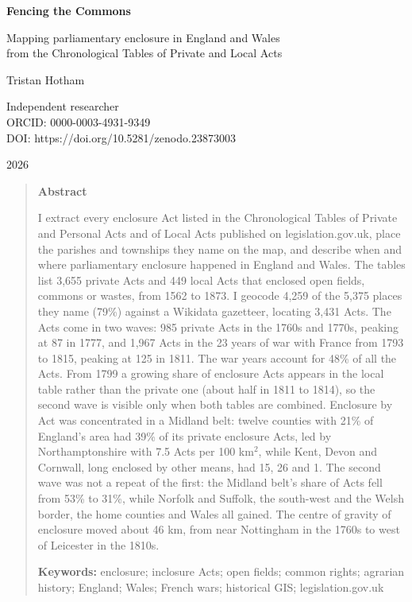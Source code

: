 \documentclass[11pt,a4paper]{article}
\begin{document}
\begin{center}
{\Large\bfseries Fencing the Commons\par}
\vspace{0.4em}
{\large Mapping parliamentary enclosure in England and Wales\\from the Chronological Tables of Private and Local Acts\par}
\vspace{1.2em}
{\large Tristan Hotham\par}
\vspace{0.3em}
{\small Independent researcher\\
ORCID: 0000-0003-4931-9349\\
DOI: https://doi.org/10.5281/zenodo.23873003\par}
\vspace{0.8em}
2026
\end{center}

\begin{quote}
\small
\begin{center}\textbf{Abstract}\end{center}
I extract every enclosure Act listed in the Chronological Tables of Private and Personal Acts and of Local Acts published on legislation.gov.uk, place the parishes and townships they name on the map, and describe when and where parliamentary enclosure happened in England and Wales. The tables list 3,655 private Acts and 449 local Acts that enclosed open fields, commons or wastes, from 1562 to 1873. I geocode 4,259 of the 5,375 places they name (79\%) against a Wikidata gazetteer, locating 3,431 Acts. The Acts come in two waves: 985 private Acts in the 1760s and 1770s, peaking at 87 in 1777, and 1,967 Acts in the 23 years of war with France from 1793 to 1815, peaking at 125 in 1811. The war years account for 48\% of all the Acts. From 1799 a growing share of enclosure Acts appears in the local table rather than the private one (about half in 1811 to 1814), so the second wave is visible only when both tables are combined. Enclosure by Act was concentrated in a Midland belt: twelve counties with 21\% of England's area had 39\% of its private enclosure Acts, led by Northamptonshire with 7.5 Acts per 100 km$^2$, while Kent, Devon and Cornwall, long enclosed by other means, had 15, 26 and 1. The second wave was not a repeat of the first: the Midland belt's share of Acts fell from 53\% to 31\%, while Norfolk and Suffolk, the south-west and the Welsh border, the home counties and Wales all gained. The centre of gravity of enclosure moved about 46 km, from near Nottingham in the 1760s to west of Leicester in the 1810s.

\textbf{Keywords:} enclosure; inclosure Acts; open fields; common rights; agrarian history; England; Wales; French wars; historical GIS; legislation.gov.uk
\end{quote}
\end{document}
